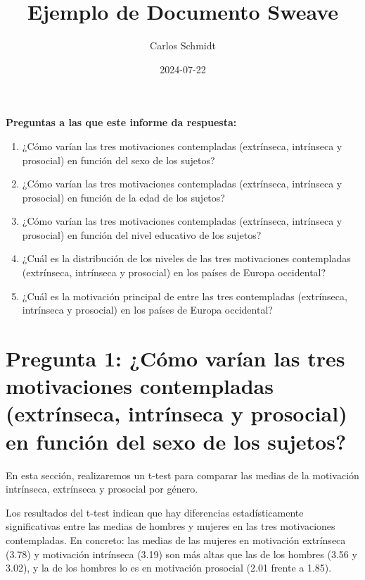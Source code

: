 \documentclass{article}
\title{Ejemplo de Documento Sweave}
\author{Carlos Schmidt}
\date{2024-07-22}
\begin{document}


\maketitle

\textbf{Preguntas a las que este informe da respuesta:}
\begin{enumerate}
    \item ¿Cómo varían las tres motivaciones contempladas (extrínseca, intrínseca y prosocial) en función del sexo de los sujetos?
    \item ¿Cómo varían las tres motivaciones contempladas (extrínseca, intrínseca y prosocial) en función de la edad de los sujetos?
    \item ¿Cómo varían las tres motivaciones contempladas (extrínseca, intrínseca y prosocial) en función del nivel educativo de los sujetos?
    \item ¿Cuál es la distribución de los niveles de las tres motivaciones contempladas (extrínseca, intrínseca y prosocial) en los países de Europa occidental?
    \item ¿Cuál es la motivación principal de entre las tres contempladas (extrínseca, intrínseca y prosocial) en los países de Europa occidental?
\end{enumerate}





\section{Pregunta 1: ¿Cómo varían las tres motivaciones contempladas (extrínseca, intrínseca y prosocial) en función del sexo de los sujetos?
}

En esta sección, realizaremos un t-test para comparar las medias de la motivación intrínseca, extrínseca y prosocial por género.


Los resultados del t-test indican que hay diferencias estadísticamente significativas entre las medias de hombres y mujeres en las tres motivaciones contempladas. En concreto: las medias de las mujeres en motivación extrínseca (3.78) y motivación intrínseca (3.19) son más altas que las de los hombres (3.56 y 3.02), y la de los hombres lo es en motivación prosocial (2.01 frente a 1.85).
\end{document}
